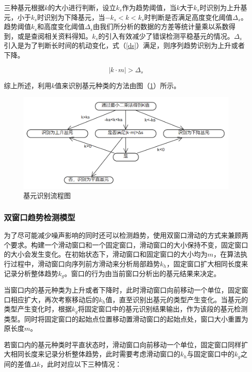 \documentclass{my_paper}
\begin{document}
三种基元根据$k$的大小进行判断，设立$k_s$作为趋势阈值，当$k$大于$k_s$时识别为上升基元，小于$k_s$时识别为下降基元，当$-k_s<k<k_s$时判断是否满足高度变化阈值$\Delta_s$。趋势阈值$k_s$和高度变化阈值$\Delta_s$由我们所分析的数据的方差等统计量乘以系数得到，或是查阅相关资料得知。$k_s$的引入有效减少了错误检测平稳基元的情况。$\Delta_s$引入是为了判断长时间的机动变化，式（\ref{ds}）满足，则序列趋势识别为上升或者下降。

\begin{equation}
|k\cdot m|>\Delta_s
\label{ds}
\end{equation}

综上所述，利用$k$值来识别基元种类的方法由图（\ref{jyz}）所示。

\begin {figure}[h]
\centering %
\includegraphics[width=\textwidth]{jiyuanz.png}
\caption{基元识别流程图} %
\label{jyz}
\end {figure}

\subsubsection{双窗口趋势检测模型}
为了尽可能减少噪声影响的同时还可以检测趋势，使用双窗口滑动的方式来兼顾两个要求。构建一个滑动窗口和一个固定窗口，滑动窗口的大小保持不变，固定窗口的大小会发生变化。在初始状态下，滑动窗口和固定窗口的大小均为$m$，在算法执行过程中，滑动窗口向序列前方滑动来分析局部趋势$k_h$，固定窗口扩大相同长度来记录分析整体趋势$k_g$。窗口的行为由当前窗口分析出的基元结果来决定。

当窗口内的基元种类为上升或者下降时，此时滑动窗口向前移动一个单位，固定窗口相应扩大，再次考察移动后的$k_h$值，直至识别出基元的类型产生变化。当基元的类型产生变化时，根据$k_g$将固定窗口中的基元识别结果输出，作为该段的基元检测类型。同时将固定窗口的起始点位置移动置滑动窗口的起始点处，窗口大小重置为原长度$m$。

若窗口内的基元种类时平直状态时，滑动窗口向前移动一个单位，固定窗口同样扩大相同长度来记录分析整体趋势，此时需要考虑滑动窗口的$k_h$与固定窗口中的$k_g$之间的差值$\Delta k$，此时对应以下三种情况：
\end{document}
